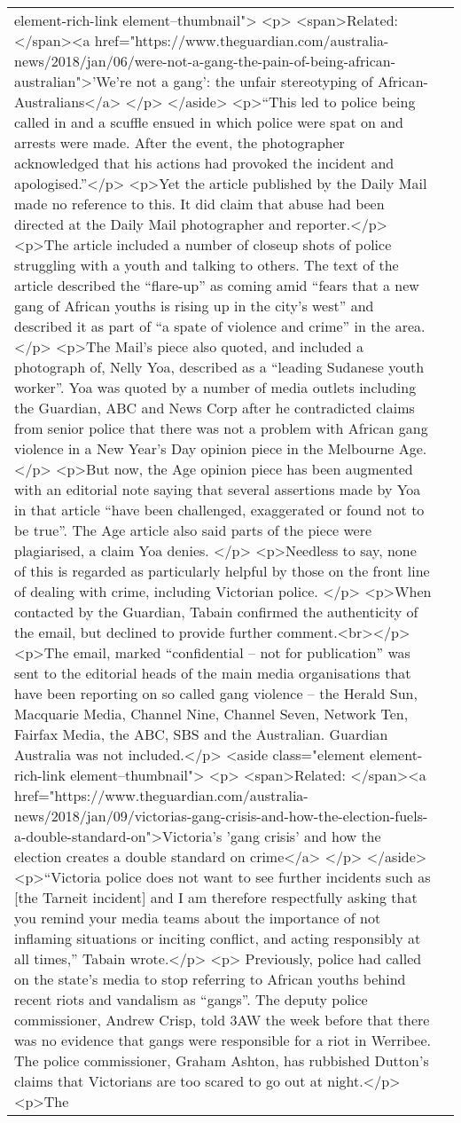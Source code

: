 \documentclass[]{article}
\begin{document}
\begin{table}[!h]
{\begin{tabular}[t]{ll}
element-rich-link element--thumbnail"> <p> <span>Related: </span><a href="https://www.theguardian.com/australia-news/2018/jan/06/were-not-a-gang-the-pain-of-being-african-australian">'We’re not a gang': the unfair stereotyping of African-Australians</a> </p> </aside>  <p>“This led to police being called in and a scuffle ensued in which police were spat on and arrests were made. After the event, the photographer acknowledged that his actions had provoked the incident and apologised.”</p> <p>Yet the article published by the Daily Mail made no reference to this. It did claim that abuse had been directed at the Daily Mail photographer and reporter.</p> <p>The article included a number of closeup shots of police struggling with a youth and talking to others. The text of the article described the “flare-up” as coming amid “fears that a new gang of African youths is rising up in the city’s west” and described it as part of “a spate of violence and crime” in the area.</p> <p>The Mail’s piece also quoted, and included a photograph of, Nelly Yoa, described as a “leading Sudanese youth worker”. Yoa was quoted by a number of media outlets including the Guardian, ABC and News Corp after he contradicted claims from senior police that there was not a problem with African gang violence in a New Year’s Day opinion piece in the Melbourne Age.</p> <p>But now, the Age opinion piece has been augmented with an editorial note saying that several assertions made by Yoa in that article “have been challenged, exaggerated or found not to be true”. The Age article also said parts of the piece were plagiarised, a claim Yoa denies. </p> <p>Needless to say, none of this is regarded as particularly helpful by those on the front line of dealing with crime, including Victorian police. </p> <p>When contacted by the Guardian, Tabain confirmed the authenticity of the email, but declined to provide further comment.<br></p> <p>The email, marked “confidential – not for publication” was sent to the editorial heads of the main media organisations that have been reporting on so called gang violence – the Herald Sun, Macquarie Media, Channel Nine, Channel Seven, Network Ten, Fairfax Media, the ABC, SBS and the Australian. Guardian Australia was not included.</p> <aside class="element element-rich-link element--thumbnail"> <p> <span>Related: </span><a href="https://www.theguardian.com/australia-news/2018/jan/09/victorias-gang-crisis-and-how-the-election-fuels-a-double-standard-on">Victoria's 'gang crisis' and how the election creates a double standard on crime</a> </p> </aside>  <p>“Victoria police does not want to see further incidents such as [the Tarneit incident] and I am therefore respectfully asking that you remind your media teams about the importance of not inflaming situations or inciting conflict, and acting responsibly at all times,” Tabain wrote.</p> <p> Previously, police had called on the state’s media to stop referring to African youths behind recent riots and vandalism as “gangs”. The deputy police commissioner, Andrew Crisp, told 3AW the week before that there was no evidence that gangs were responsible for a riot in Werribee. The police commissioner, Graham Ashton, has rubbished Dutton’s claims that Victorians are too scared to go out at night.</p> <p>The 
\end{tabular}}
\end{table}
\end{document}
